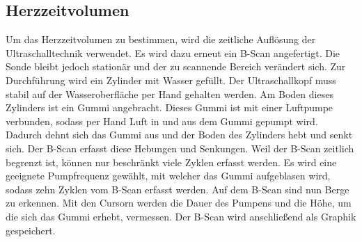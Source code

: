 \subsection{Herzzeitvolumen}

Um das Herzzeitvolumen zu bestimmen, wird die zeitliche Auflösung der Ultraschalltechnik verwendet. 
Es wird dazu erneut ein B-Scan angefertigt. Die Sonde bleibt jedoch stationär und der zu scannende 
Bereich verändert sich. Zur Durchführung wird ein Zylinder mit Wasser gefüllt. Der Ultraschallkopf 
muss stabil auf der Wasseroberfläche per Hand gehalten werden. Am Boden dieses 
Zylinders ist ein Gummi angebracht. Dieses Gummi ist mit einer Luftpumpe verbunden, sodass per Hand 
Luft in und aus dem Gummi gepumpt wird. Dadurch dehnt sich das Gummi aus und der Boden des Zylinders 
hebt und senkt sich. Der B-Scan erfasst diese Hebungen und Senkungen. Weil der B-Scan zeitlich 
begrenzt ist, können nur beschränkt viele Zyklen erfasst werden. Es wird eine geeignete Pumpfrequenz 
gewählt, mit welcher das Gummi aufgeblasen wird, sodass zehn Zyklen vom B-Scan erfasst werden. Auf 
dem B-Scan sind nun Berge zu erkennen. Mit den Cursorn werden die Dauer des Pumpens und die Höhe, um 
die sich das Gummi erhebt, vermessen. Der B-Scan wird anschließend als Graphik gespeichert.









